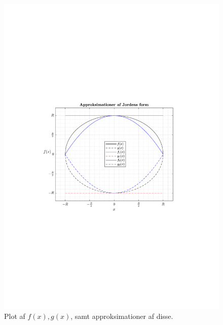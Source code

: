 \begin{figure}[h!]
	\centering
	\includegraphics[trim=3.9cm 9.4cm 4cm 9.4cm,width=0.6\columnwidth]{matematik/fig/JordensForm.pdf}
	\caption{Plot af $f(x),g(x)$, samt approksimationer af disse.} \label{fig:JordensForm}
\end{figure}
